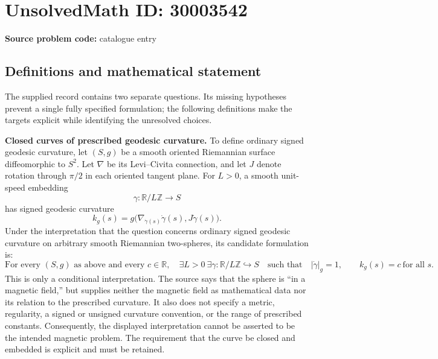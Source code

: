 \documentclass[11pt]{article}
\newcommand{\Z}{\mathbb{Z}}
\newcommand{\R}{\mathbb{R}}
\begin{document}
\section*{UnsolvedMath ID: 30003542}
\textbf{Source problem code:} catalogue entry
\subsection{Definitions and mathematical statement}
The supplied record contains two separate questions. Its missing hypotheses prevent a single fully specified formulation; the following definitions make the targets explicit while identifying the unresolved choices.

\textbf{Closed curves of prescribed geodesic curvature.} To define ordinary signed geodesic curvature, let \((S,g)\) be a smooth oriented Riemannian surface diffeomorphic to \(S^2\). Let \(\nabla\) be its Levi--Civita connection, and let \(J\) denote rotation through \(\pi/2\) in each oriented tangent plane. For \(L>0\), a smooth unit-speed embedding
\[
\gamma:\R/L\Z\longrightarrow S
\]
has signed geodesic curvature
\[
k_g(s)=g\bigl(\nabla_{\dot\gamma(s)}\dot\gamma(s),J\dot\gamma(s)\bigr).
\]
Under the interpretation that the question concerns ordinary signed geodesic curvature on arbitrary smooth Riemannian two-spheres, its candidate formulation is:
\[
\text{For every }(S,g)\text{ as above and every }c\in\R,
\quad \exists L>0\ \exists\gamma:\R/L\Z\hookrightarrow S
\quad\text{such that}\quad
|\dot\gamma|_g=1,\qquad k_g(s)=c\ \text{for all }s.
\]
This is only a conditional interpretation. The source says that the sphere is ``in a magnetic field,'' but supplies neither the magnetic field as mathematical data nor its relation to the prescribed curvature. It also does not specify a metric, regularity, a signed or unsigned curvature convention, or the range of prescribed constants. Consequently, the displayed interpretation cannot be asserted to be the intended magnetic problem. The requirement that the curve be closed and embedded is explicit and must be retained.
\end{document}
